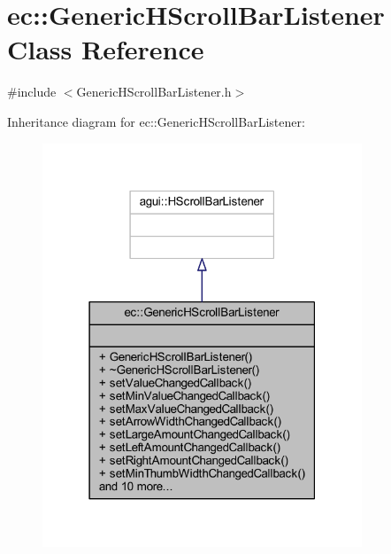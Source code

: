 \hypertarget{classec_1_1_generic_h_scroll_bar_listener}{}\section{ec\+:\+:Generic\+H\+Scroll\+Bar\+Listener Class Reference}
\label{classec_1_1_generic_h_scroll_bar_listener}


{\ttfamily \#include $<$Generic\+H\+Scroll\+Bar\+Listener.\+h$>$}



Inheritance diagram for ec\+:\+:Generic\+H\+Scroll\+Bar\+Listener\+:\nopagebreak
\begin{figure}[H]
\begin{center}
\leavevmode
\includegraphics[width=271pt]{classec_1_1_generic_h_scroll_bar_listener__inherit__graph}
\end{center}
\end{figure}


